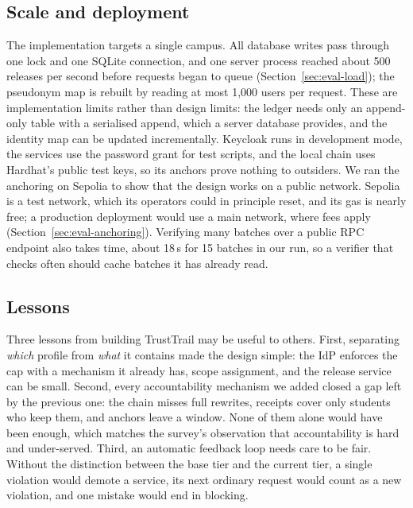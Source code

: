 \subsection{Scale and deployment}
The implementation targets a single campus. All database writes pass through one lock and one SQLite connection, and one server process reached about 500 releases per second before requests began to queue (Section~\ref{sec:eval-load}); the pseudonym map is rebuilt by reading at most 1{,}000 users per request. These are implementation limits rather than design limits: the ledger needs only an append-only table with a serialised append, which a server database provides, and the identity map can be updated incrementally. Keycloak runs in development mode, the services use the password grant for test scripts, and the local chain uses Hardhat's public test keys, so its anchors prove nothing to outsiders. We ran the anchoring on Sepolia to show that the design works on a public network. Sepolia is a test network, which its operators could in principle reset, and its gas is nearly free; a production deployment would use a main network, where fees apply (Section~\ref{sec:eval-anchoring}). Verifying many batches over a public RPC endpoint also takes time, about 18\,s for 15 batches in our run, so a verifier that checks often should cache batches it has already read.

\subsection{Lessons}
Three lessons from building TrustTrail may be useful to others. First, separating \emph{which} profile from \emph{what} it contains made the design simple: the IdP enforces the cap with a mechanism it already has, scope assignment, and the release service can be small. Second, every accountability mechanism we added closed a gap left by the previous one: the chain misses full rewrites, receipts cover only students who keep them, and anchors leave a window. None of them alone would have been enough, which matches the survey's observation that accountability is hard and under-served. Third, an automatic feedback loop needs care to be fair. Without the distinction between the base tier and the current tier, a single violation would demote a service, its next ordinary request would count as a new violation, and one mistake would end in blocking.
